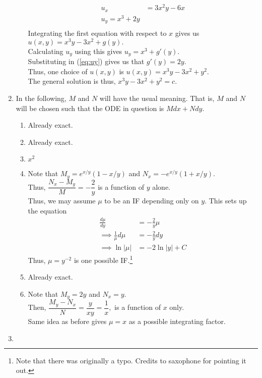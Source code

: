 \documentclass{article}
\begin{document}
\begin{enumerate}[label = Q.\arabic*.]
\begin{enumerate}[label = (\roman*)]
		\begin{align} 
			u_x &= 3x^2y - 6x \label{eq:ux}\\
			u_y = x^3 + 2y \label{eq:uy}\\
		\end{align}
		Integrating the first equation with respect to $x$ gives us $u(x, y) = x^3y - 3x^2 + g(y).$\\
		Calculating $u_y$ using this gives $u_y = x^3 + g'(y).$ \\
		Substituting in (\ref{eq:uy}) gives us that $g'(y) = 2y.$\\
		Thus, one choice of $u(x, y)$ is $u(x, y) = x^3y - 3x^2 + y^2.$\\
		The general solution is thus, $x^3y - 3x^2 + y^2 = c.$
	\end{enumerate}
	\item In the following, $M$ and $N$ will have the usual meaning. That is, $M$ and $N$ will be chosen such that the ODE in question is $Mdx + Ndy.$
	\begin{enumerate}[label = (\roman*)] 
		\item Already exact.
		\item Already exact.
		\item $x^2$
		\item Note that $M_y = e^{x/y}(1 - x/y)$ and $N_x = -e^{x/y}(1 + x/y).$\\
		Thus, $\dfrac{N_x - M_y}{M} = -\dfrac{2}{y}$ is a function of $y$ alone.\\
		Thus, we may assume $\mu$ to be an IF depending only on $y.$ This sets up the equation
		\begin{align*} 
			\frac{d\mu}{dy} &= -\frac{2}{y}\mu\\
			\implies \frac{1}{\mu}d\mu &= -\frac{2}{y}dy\\
			\implies \ln|\mu| &= -2\ln|y| + C
		\end{align*}
		Thus, $\mu = y^{-2}$ is one possible IF.\footnote{Note that there was originally a typo. Credits to saxophone for pointing it out.}\\
		\item Already exact.
		\item Note that $M_y = 2y$ and $N_x = y.$\\
		Then, $\dfrac{M_y - N_x}{N} = \dfrac{y}{xy} = \dfrac{1}{x},$ is a function of $x$ only.\\
		Same idea as before gives $\mu = x$ as a possible integrating factor.
	\end{enumerate}
	\item \begin{align*} 

\end{align*}
\end{enumerate}
\end{document}
